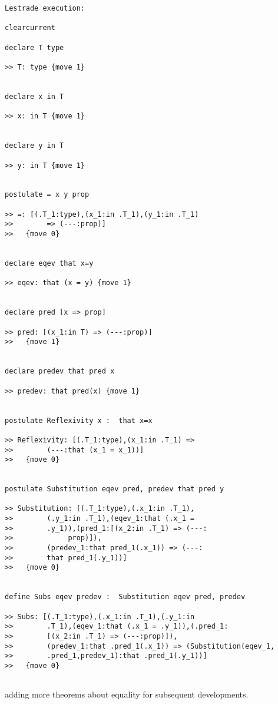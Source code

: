 \documentclass[12pt]{article}
\begin{document}
\begin{verbatim}Lestrade execution:

clearcurrent

declare T type

>> T: type {move 1}


declare x in T

>> x: in T {move 1}


declare y in T

>> y: in T {move 1}


postulate = x y prop

>> =: [(.T_1:type),(x_1:in .T_1),(y_1:in .T_1) 
>>        => (---:prop)]
>>   {move 0}


declare eqev that x=y

>> eqev: that (x = y) {move 1}


declare pred [x => prop]

>> pred: [(x_1:in T) => (---:prop)]
>>   {move 1}


declare predev that pred x

>> predev: that pred(x) {move 1}


postulate Reflexivity x :  that x=x

>> Reflexivity: [(.T_1:type),(x_1:in .T_1) => 
>>        (---:that (x_1 = x_1))]
>>   {move 0}


postulate Substitution eqev pred, predev that pred y

>> Substitution: [(.T_1:type),(.x_1:in .T_1),
>>        (.y_1:in .T_1),(eqev_1:that (.x_1 = 
>>        .y_1)),(pred_1:[(x_2:in .T_1) => (---:
>>             prop)]),
>>        (predev_1:that pred_1(.x_1)) => (---:
>>        that pred_1(.y_1))]
>>   {move 0}


define Subs eqev predev :  Substitution eqev pred, predev

>> Subs: [(.T_1:type),(.x_1:in .T_1),(.y_1:in 
>>        .T_1),(eqev_1:that (.x_1 = .y_1)),(.pred_1:
>>        [(x_2:in .T_1) => (---:prop)]),
>>        (predev_1:that .pred_1(.x_1)) => (Substitution(eqev_1,
>>        .pred_1,predev_1):that .pred_1(.y_1))]
>>   {move 0}


\end{verbatim}

adding more theorems about equality for subsequent developments.
\end{document}
